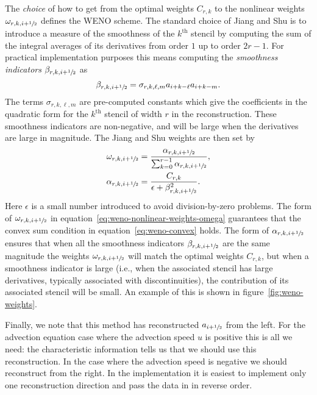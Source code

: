 The \emph{choice} of how to get from the optimal weights $C_{r, k}$ to the
nonlinear weights $\omega_{r, k, i+{\sfrac{1}{2}}}$ defines the WENO scheme. The
standard choice of Jiang and Shu is to introduce a measure of the smoothness of
the $k^{\text{th}}$ stencil by computing the sum of the integral averages of
its derivatives from order $1$ up to order $2 r - 1$. For practical
implementation purposes this means computing the \emph{smoothness indicators}
$\beta_{r, k, i+{\sfrac{1}{2}}}$ as
\begin{equation}
  \label{eq:weno-smoothness}
  \beta_{r, k, i+{\sfrac{1}{2}}} = \sigma_{r, k, \ell, m} a_{i+k-\ell} a_{i+k-m}.
\end{equation}
The terms $\sigma_{r, k, \ell, m}$ are pre-computed constants which give the
coefficients in the quadratic form for the $k^{\text{th}}$ stencil of width $r$
in the reconstruction. These smoothness indicators are non-negative, and will
be large when the derivatives are large in magnitude. The Jiang and Shu weights
are then set by
\begin{subequations}
  \label{eq:weno-nonlinear-weights}
  \begin{align}
    \label{eq:weno-nonlinear-weights-omega}
    \omega_{r, k, i+{\sfrac{1}{2}}} &= \frac{\alpha_{r, k, i+{\sfrac{1}{2}}}}{\sum_{k=0}^{r-1} \alpha_{r, k, i+{\sfrac{1}{2}}}}, \\
      \label{eq:weno-nonlinear-weights-alpha}
    \alpha_{r, k, i+{\sfrac{1}{2}}} &= \frac{C_{r, k}}{\epsilon + \beta_{r, k, i+{\sfrac{1}{2}}}^2}.
  \end{align}
\end{subequations}
Here $\epsilon$ is a small number introduced to avoid division-by-zero problems.
The form of $\omega_{r, k, i+{\sfrac{1}{2}}}$ in
equation~\eqref{eq:weno-nonlinear-weights-omega} guarantees that the convex sum
condition in equation~\eqref{eq:weno-convex} holds. The form of $\alpha_{r, k,
i+{\sfrac{1}{2}}}$ ensures that when all the smoothness indicators $\beta_{r, k,
i+{\sfrac{1}{2}}}$ are the same magnitude the weights $\omega_{r, k, i+{\sfrac{1}{2}}}$ will
match the optimal weights $C_{r, k}$, but when a smoothness indicator is large
(i.e., when the associated stencil has large derivatives, typically associated
with discontinuities), the contribution of its associated stencil will be small.
An example of this is shown in figure~\ref{fig:weno-weights}.

Finally, we note that this method has reconstructed $a_{i+{\sfrac{1}{2}}}$ from the
left. For the advection equation case where the advection speed $u$ is positive
this is all we need: the characteristic information tells us that we should use
this reconstruction. In the case where the advection speed is negative we
should reconstruct from the right. In the implementation it is easiest to
implement only one reconstruction direction and pass the data in in reverse
order.


